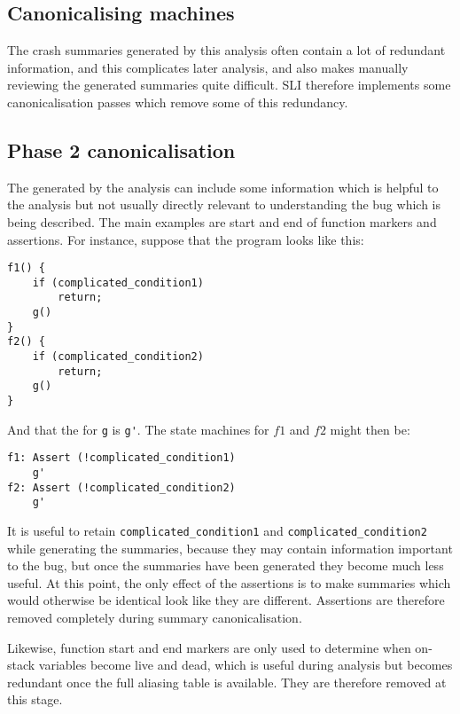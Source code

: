 \subsection{Canonicalising machines}

The crash summaries generated by this analysis often contain a lot of redundant information, and this complicates later analysis, and also makes manually reviewing the generated summaries quite difficult.
SLI therefore implements some canonicalisation passes which remove some of this redundancy.


\subsection{Phase 2 canonicalisation}
The \StateMachines generated by the analysis can include some
information which is helpful to the analysis but not usually directly
relevant to understanding the bug which is being described.  The main
examples are start and end of function markers and assertions.  For
instance, suppose that the program looks like this:

\begin{verbatim}
f1() {
    if (complicated_condition1)
        return;
    g()
}
f2() {
    if (complicated_condition2)
        return;
    g()
}
\end{verbatim}

And that the \StateMachine for \verb|g| is \verb|g'|.
The state machines for $f1$ and $f2$ might then be:

\begin{verbatim}
f1: Assert (!complicated_condition1)
    g'
f2: Assert (!complicated_condition2)
    g'
\end{verbatim}

It is useful to retain \verb|complicated_condition1| and \verb|complicated_condition2| while generating the summaries, because they may contain information important to the bug, but once the summaries have been generated they become much less useful.
At this point, the only effect of the assertions is to make summaries which would otherwise be identical look like they are different.
Assertions are therefore removed completely during summary canonicalisation.

Likewise, function start and end markers are only used to determine when on-stack variables become live and dead, which is useful during analysis but becomes redundant once the full aliasing table is available.
They are therefore removed at this stage.

